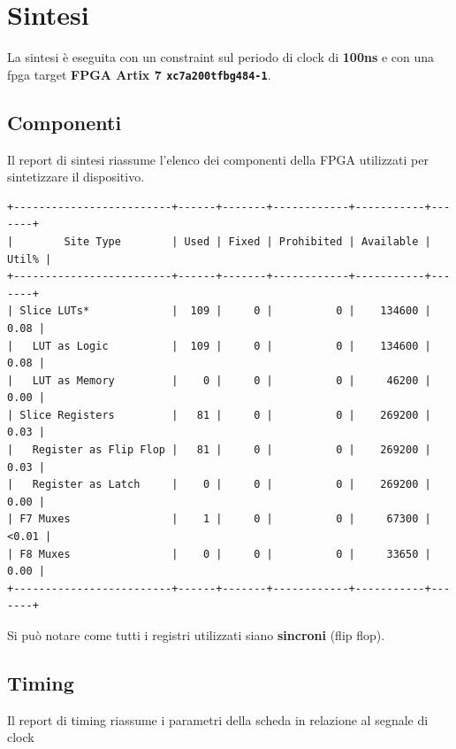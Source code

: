 \documentclass[a4paper]{report}
\begin{document}
\section{Sintesi}
La sintesi è eseguita con un constraint sul periodo di clock di \textbf{100ns} e con una fpga target \textbf{FPGA Artix 7 \texttt{xc7a200tfbg484-1}}.
\subsection{Componenti}
Il report di sintesi riassume l'elenco dei componenti della FPGA utilizzati per sintetizzare il dispositivo.

\begin{verbatim}
+-------------------------+------+-------+------------+-----------+-------+
|        Site Type        | Used | Fixed | Prohibited | Available | Util% |
+-------------------------+------+-------+------------+-----------+-------+
| Slice LUTs*             |  109 |     0 |          0 |    134600 |  0.08 |
|   LUT as Logic          |  109 |     0 |          0 |    134600 |  0.08 |
|   LUT as Memory         |    0 |     0 |          0 |     46200 |  0.00 |
| Slice Registers         |   81 |     0 |          0 |    269200 |  0.03 |
|   Register as Flip Flop |   81 |     0 |          0 |    269200 |  0.03 |
|   Register as Latch     |    0 |     0 |          0 |    269200 |  0.00 |
| F7 Muxes                |    1 |     0 |          0 |     67300 | <0.01 |
| F8 Muxes                |    0 |     0 |          0 |     33650 |  0.00 |
+-------------------------+------+-------+------------+-----------+-------+
\end{verbatim}

Si può notare come tutti i registri utilizzati siano    \textbf{sincroni} (flip flop).

\newpage
\subsection{Timing}
Il report di timing riassume i parametri della scheda in relazione al segnale di clock
\end{document}
